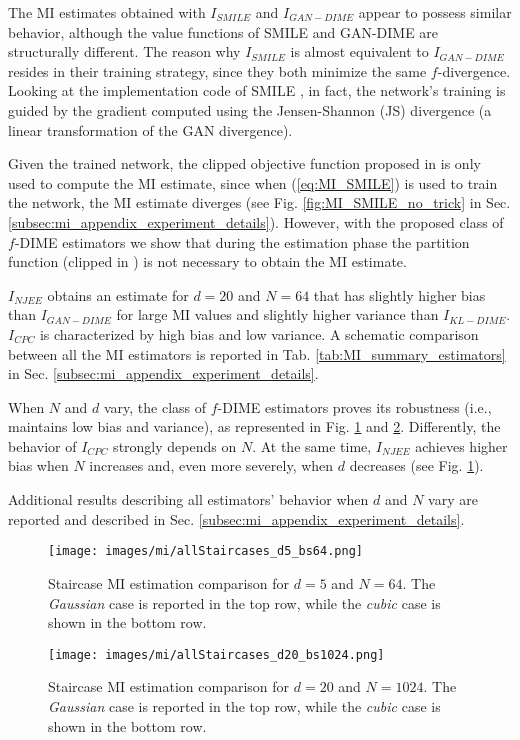 The MI estimates obtained with $I_{SMILE}$ and $I_{GAN-DIME}$ appear to possess similar behavior, although the value functions of SMILE and GAN-DIME are structurally different.
The reason why $I_{SMILE}$ is almost equivalent to $I_{GAN-DIME}$ resides in their training strategy, since they both minimize the same $f$-divergence.
Looking at the implementation code of SMILE \cite{SMILE_github}, in fact, the network's training is guided by the gradient computed using the Jensen-Shannon (JS) divergence (a linear transformation of the GAN divergence). 

Given the trained network, the clipped objective function proposed in \cite{Song2020} is only used to compute the MI estimate, since when (\ref{eq:MI_SMILE}) is used to train the network, the MI estimate diverges (see Fig. \ref{fig:MI_SMILE_no_trick} in Sec. \ref{subsec:mi_appendix_experiment_details}). 
However, with the proposed class of $f$-DIME estimators we show that during the estimation phase the partition function (clipped in \cite{Song2020}) is not necessary to obtain the MI estimate.

$I_{NJEE}$ obtains an estimate for $d=20$ and $N=64$ that has slightly higher bias than $I_{GAN-DIME}$ for large MI values and slightly higher variance than $I_{KL-DIME}$.
$I_{CPC}$ is characterized by high bias and low variance. A schematic comparison between all the MI estimators is reported in Tab. \ref{tab:MI_summary_estimators} in Sec. \ref{subsec:mi_appendix_experiment_details}.

When $N$ and $d$ vary, the class of $f$-DIME estimators proves its robustness (i.e., maintains low bias and variance), as represented in Fig. \ref{fig:MI_stairs_d5_bs64} and \ref{fig:MI_stairs_d20_bs1024}. Differently, the behavior of $I_{CPC}$ strongly depends on $N$. At the same time, $I_{NJEE}$ achieves higher bias when $N$ increases and, even more severely, when $d$ decreases (see Fig. \ref{fig:MI_stairs_d5_bs64}). 

Additional results describing all estimators' behavior when $d$ and $N$ vary are reported and described in Sec.  \ref{subsec:mi_appendix_experiment_details}.

\begin{figure}
	\centering
	\texttt{[image: images/mi/allStaircases\_d5\_bs64.png]}
	\caption{Staircase MI estimation comparison for $d=5$ and $N=64$. The \textit{Gaussian} case is reported in the top row, while the \textit{cubic} case is shown in the bottom row.}
	\label{fig:MI_stairs_d5_bs64}
\end{figure} 
 \begin{figure}
	\centering
	\texttt{[image: images/mi/allStaircases\_d20\_bs1024.png]}
	\caption{Staircase MI estimation comparison for $d=20$ and $N=1024$. The \textit{Gaussian} case is reported in the top row, while the \textit{cubic} case is shown in the bottom row.}
	\label{fig:MI_stairs_d20_bs1024}
\end{figure} 

